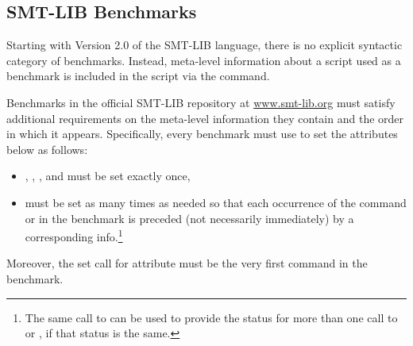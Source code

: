 \subsection{SMT-LIB Benchmarks} \label{sec:benchmarks}
Starting with Version 2.0 of the SMT-LIB language, 
there is no explicit syntactic category of benchmarks.  
Instead, meta-level information about a script used as a benchmark is included 
in the script via the  command.  

Benchmarks in the official SMT-LIB repository at \href{http://www.smt-lib.org}{www.smt-lib.org}
must satisfy additional requirements on the meta-level information they contain
and the order in which it appears. 
Specifically, every benchmark must use  to set
the attributes below as follows: 
%
\begin{itemize}
\item
{}, , , and  must be set exactly once,
\item
{} must be set as many times as needed so that each occurrence 
of the command  or  
in the benchmark is preceded (not necessarily immediately)
by a corresponding  info.\footnote{%
The same call to  can be used to provide the status 
for more than one call to  or ,
if that status is the same.
}
\end{itemize}
%
Moreover, the set  call for attribute  must be the very first command in the benchmark.
\medskip
